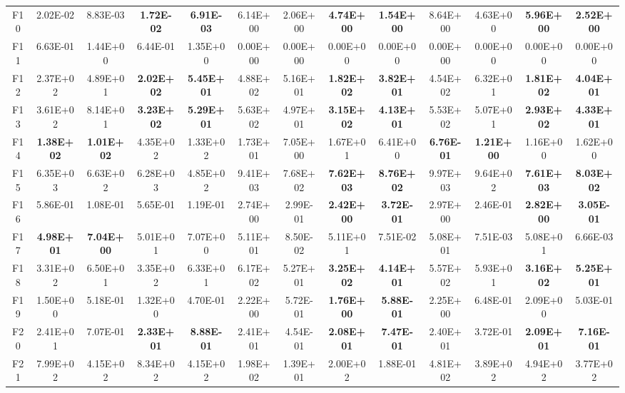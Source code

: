 \begin{table*}[!ht]
\begin{tabular}{|c|cc|cc|cc|cc|cc|cc|}
    F10   & 2.02E-02 & 8.83E-03 & \textbf{1.72E-02} & \textbf{6.91E-03} & 6.14E+00 & 2.06E+00 & \textbf{4.74E+00} & \textbf{1.54E+00} & 8.64E+00 & 4.63E+00 & \textbf{5.96E+00} & \textbf{2.52E+00} \\
    F11   & 6.63E-01 & 1.44E+00 & 6.44E-01 & 1.35E+00 & 0.00E+00 & 0.00E+00 & 0.00E+00 & 0.00E+00 & 0.00E+00 & 0.00E+00 & 0.00E+00 & 0.00E+00 \\
    F12   & 2.37E+02 & 4.89E+01 & \textbf{2.02E+02} & \textbf{5.45E+01} & 4.88E+02 & 5.16E+01 & \textbf{1.82E+02} & \textbf{3.82E+01} & 4.54E+02 & 6.32E+01 & \textbf{1.81E+02} & \textbf{4.04E+01} \\
    F13   & 3.61E+02 & 8.14E+01 & \textbf{3.23E+02} & \textbf{5.29E+01} & 5.63E+02 & 4.97E+01 & \textbf{3.15E+02} & \textbf{4.13E+01} & 5.53E+02 & 5.07E+01 & \textbf{2.93E+02} & \textbf{4.33E+01} \\
    F14   & \textbf{1.38E+02} & \textbf{1.01E+02} & 4.35E+02 & 1.33E+02 & 1.73E+01 & 7.05E+00 & 1.67E+01 & 6.41E+00 & \textbf{6.76E-01} & \textbf{1.21E+00} & 1.16E+00 & 1.62E+00 \\
    F15   & 6.35E+03 & 6.63E+02 & 6.28E+03 & 4.85E+02 & 9.41E+03 & 7.68E+02 & \textbf{7.62E+03} & \textbf{8.76E+02} & 9.97E+03 & 9.64E+02 & \textbf{7.61E+03} & \textbf{8.03E+02} \\
    F16   & 5.86E-01 & 1.08E-01 & 5.65E-01 & 1.19E-01 & 2.74E+00 & 2.99E-01 & \textbf{2.42E+00} & \textbf{3.72E-01} & 2.97E+00 & 2.46E-01 & \textbf{2.82E+00} & \textbf{3.05E-01} \\
    F17   & \textbf{4.98E+01} & \textbf{7.04E+00} & 5.01E+01 & 7.07E+00 & 5.11E+01 & 8.50E-02 & 5.11E+01 & 7.51E-02 & 5.08E+01 & 7.51E-03 & 5.08E+01 & 6.66E-03 \\
    F18   & 3.31E+02 & 6.50E+01 & 3.35E+02 & 6.33E+01 & 6.17E+02 & 5.27E+01 & \textbf{3.25E+02} & \textbf{4.14E+01} & 5.57E+02 & 5.93E+01 & \textbf{3.16E+02} & \textbf{5.25E+01} \\
    F19   & 1.50E+00 & 5.18E-01 & 1.32E+00 & 4.70E-01 & 2.22E+00 & 5.72E-01 & \textbf{1.76E+00} & \textbf{5.88E-01} & 2.25E+00 & 6.48E-01 & 2.09E+00 & 5.03E-01 \\
    F20   & 2.41E+01 & 7.07E-01 & \textbf{2.33E+01} & \textbf{8.88E-01} & 2.41E+01 & 4.54E-01 & \textbf{2.08E+01} & \textbf{7.47E-01} & 2.40E+01 & 3.72E-01 & \textbf{2.09E+01} & \textbf{7.16E-01} \\
    \hline
    F21   & 7.99E+02 & 4.15E+02 & 8.34E+02 & 4.15E+02 & 1.98E+02 & 1.39E+01 & 2.00E+02 & 1.88E-01 & 4.81E+02 & 3.89E+02 & 4.94E+02 & 3.77E+02 \\

\end{tabular}
\end{table*}
